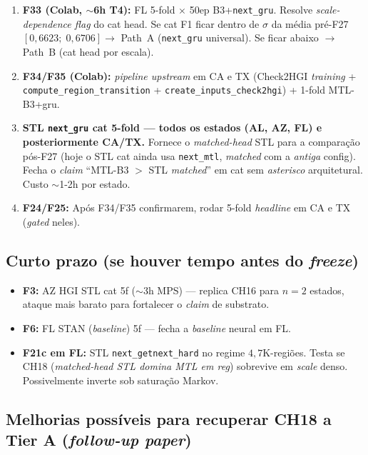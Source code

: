 \documentclass[11pt,a4paper]{article}
\begin{document}
\begin{enumerate}[leftmargin=*,noitemsep]
\item \textbf{F33 (Colab, $\sim$6h T4):} FL 5-fold $\times$ 50ep B3+\texttt{next\_gru}. Resolve \textit{scale-dependence flag} do cat head. Se cat F1 ficar dentro de $\sigma$ da média pré-F27 $[0{,}6623;\;0{,}6706] \to$ Path~A (\texttt{next\_gru} universal). Se ficar abaixo $\to$ Path~B (cat head por escala).
\item \textbf{F34/F35 (Colab):} \textit{pipeline upstream} em CA e TX (Check2HGI \textit{training} + \texttt{compute\_region\_transition} + \texttt{create\_inputs\_check2hgi}) + 1-fold MTL-B3+gru.
\item \textbf{STL \texttt{next\_gru} cat 5-fold --- todos os estados (AL, AZ, FL) e posteriormente CA/TX.} Fornece o \textit{matched-head} STL para a comparação pós-F27 (hoje o STL cat ainda usa \texttt{next\_mtl}, \textit{matched} com a \emph{antiga} config). Fecha o \textit{claim} ``MTL-B3 $>$ STL \textit{matched}'' em cat sem \textit{asterisco} arquitetural. Custo $\sim$1-2h por estado.
\item \textbf{F24/F25:} Após F34/F35 confirmarem, rodar 5-fold \textit{headline} em CA e TX (\textit{gated} neles).
\end{enumerate}

\subsection*{Curto prazo (se houver tempo antes do \textit{freeze})}

\begin{itemize}[leftmargin=*,noitemsep]
\item \textbf{F3:} AZ HGI STL cat 5f ($\sim$3h MPS) --- replica CH16 para $n=2$ estados, ataque mais barato para fortalecer o \textit{claim} de substrato.
\item \textbf{F6:} FL STAN (\textit{baseline}) 5f --- fecha a \textit{baseline} neural em FL.
\item \textbf{F21c em FL:} STL \texttt{next\_getnext\_hard} no regime $4{,}7$K-regiões. Testa se CH18 (\textit{matched-head STL domina MTL em reg}) sobrevive em \textit{scale} denso. Possivelmente inverte sob saturação Markov.
\end{itemize}

\subsection*{Melhorias possíveis para recuperar CH18 a Tier A (\textit{follow-up paper})}
\end{document}
